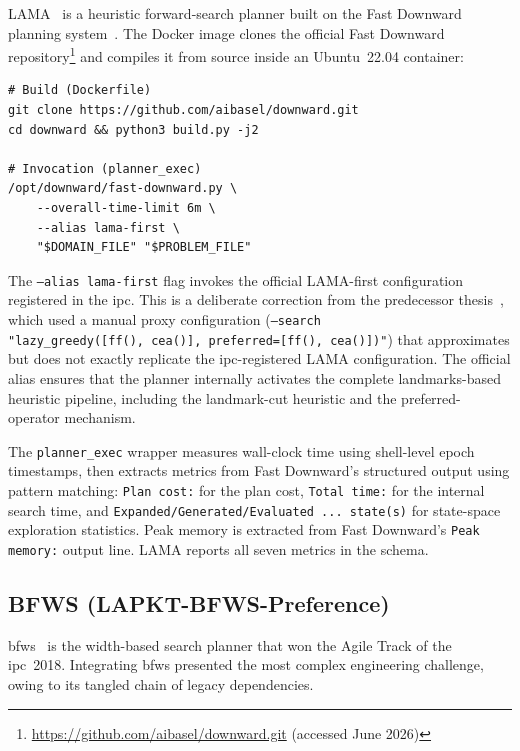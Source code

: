 LAMA~\cite{RichterWestphal2010} is a heuristic forward-search planner built on the Fast Downward planning system~\cite{Helmert2006}.
The Docker image clones the official Fast Downward repository\footnote{\url{https://github.com/aibasel/downward.git} (accessed June 2026)} and compiles it from source inside an Ubuntu~22.04 container:

\begin{lstlisting}[language={}, caption={Build and invocation of LAMA inside its Docker container.}, label={lst:lama_build}, basicstyle=\small\ttfamily, numbers=none, frame=single, xleftmargin=0.5cm, xrightmargin=0.5cm, breaklines=true]
# Build (Dockerfile)
git clone https://github.com/aibasel/downward.git
cd downward && python3 build.py -j2

# Invocation (planner_exec)
/opt/downward/fast-downward.py \
    --overall-time-limit 6m \
    --alias lama-first \
    "$DOMAIN_FILE" "$PROBLEM_FILE"
\end{lstlisting}

The \texttt{--alias lama-first} flag invokes the official LAMA-first configuration registered in the \gls{ipc}.
This is a deliberate correction from the predecessor thesis~\cite{Elis2025}, which used a manual proxy configuration (\texttt{--search "lazy\_greedy([ff(),~cea()], preferred=[ff(),~cea()])"}) that approximates but does not exactly replicate the \gls{ipc}-registered LAMA configuration.
The official alias ensures that the planner internally activates the complete landmarks-based heuristic pipeline, including the landmark-cut heuristic and the preferred-operator mechanism.

The \texttt{planner\_exec} wrapper measures wall-clock time using shell-level epoch timestamps, then extracts metrics from Fast Downward's structured output using pattern matching: \texttt{Plan cost:} for the plan cost, \texttt{Total time:} for the internal search time, and \texttt{Expanded/Generated/Evaluated ... state(s)} for state-space exploration statistics.
Peak memory is extracted from Fast Downward's \texttt{Peak memory:} output line.
LAMA reports all seven metrics in the schema.


\subsection{BFWS (LAPKT-BFWS-Preference)}
\label{sec:impl:bfws}

\gls{bfws}~\cite{LipovetzkyGeffner2017} is the width-based search planner that won the Agile Track of the \gls{ipc}~2018.
Integrating \gls{bfws} presented the most complex engineering challenge, owing to its tangled chain of legacy dependencies.

